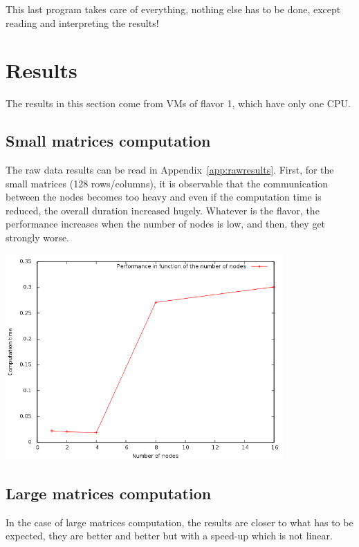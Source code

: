 \documentclass[a4paper,11pt]{article}
\begin{document}
This last program takes care of everything, nothing else has to be done, except
reading and interpreting the results!

\section{Results}

The results in this section come from VMs of flavor 1, which have only one CPU.

\subsection{Small matrices computation}

The raw data results can be read in Appendix~\ref{app:rawresults}. First, for the
small matrices (128 rows/columns), it is observable that the communication between the
nodes becomes too heavy and even if the computation time is reduced, the overall
duration increased hugely. Whatever is the flavor, the performance increases
when the number of nodes is low, and then, they get strongly worse.

\begin{center}
  \includegraphics[width=0.8\textwidth]{./128perf.png}
\end{center}

\subsection{Large matrices computation}

In the case of large matrices computation, the results are closer to what
has to be expected, they are better and better but with a speed-up which is
not linear.
\end{document}
